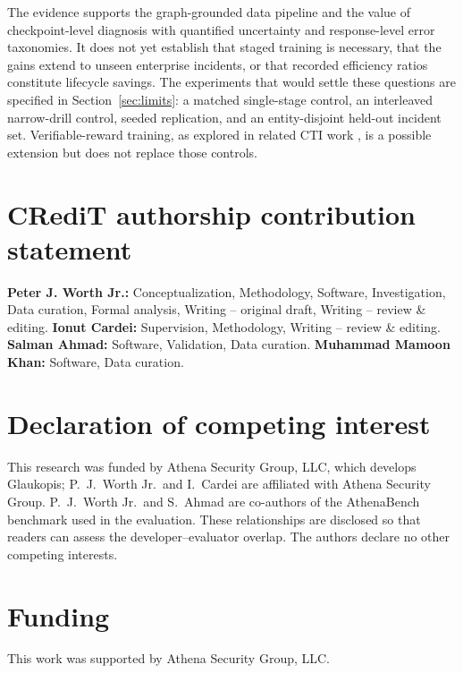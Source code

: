 \documentclass[preprint,12pt,authoryear]{elsarticle}
\begin{document}
The evidence supports the graph-grounded data pipeline and the value of checkpoint-level diagnosis with quantified uncertainty and response-level error taxonomies. It does not yet establish that staged training is necessary, that the gains extend to unseen enterprise incidents, or that recorded efficiency ratios constitute lifecycle savings. The experiments that would settle these questions are specified in Section~\ref{sec:limits}: a matched single-stage control, an interleaved narrow-drill control, seeded replication, and an entity-disjoint held-out incident set. Verifiable-reward training, as explored in related CTI work \citep{alam2026minerva}, is a possible extension but does not replace those controls.

\section*{CRediT authorship contribution statement}
\textbf{Peter J. Worth Jr.:} Conceptualization, Methodology, Software, Investigation, Data curation, Formal analysis, Writing -- original draft, Writing -- review \& editing. \textbf{Ionut Cardei:} Supervision, Methodology, Writing -- review \& editing. \textbf{Salman Ahmad:} Software, Validation, Data curation. \textbf{Muhammad Mamoon Khan:} Software, Data curation.

\section*{Declaration of competing interest}
This research was funded by Athena Security Group, LLC, which develops Glaukopis; P.~J.~Worth Jr.\ and I.~Cardei are affiliated with Athena Security Group. P.~J.~Worth Jr.\ and S.~Ahmad are co-authors of the AthenaBench benchmark used in the evaluation. These relationships are disclosed so that readers can assess the developer--evaluator overlap. The authors declare no other competing interests.

\section*{Funding}
This work was supported by Athena Security Group, LLC.
\end{document}
